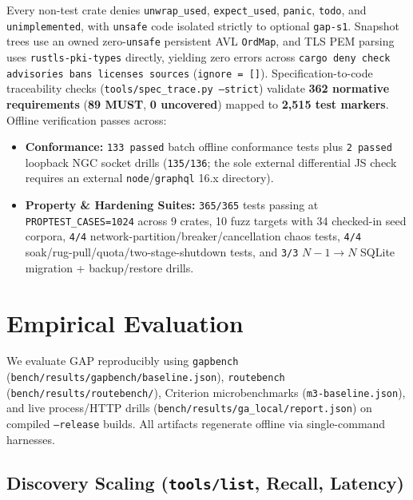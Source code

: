 \documentclass[10pt,twocolumn]{article}
\begin{document}
Every non-test crate denies \texttt{unwrap\_used}, \texttt{expect\_used}, \texttt{panic}, \texttt{todo}, and \texttt{unimplemented}, with \texttt{unsafe} code isolated strictly to optional \texttt{gap-s1}. Snapshot trees use an owned zero-\texttt{unsafe} persistent AVL \texttt{OrdMap}, and TLS PEM parsing uses \texttt{rustls-pki-types} directly, yielding zero errors across \texttt{cargo deny check advisories bans licenses sources} (\texttt{ignore = []}). Specification-to-code traceability checks (\texttt{tools/spec\_trace.py --strict}) validate \textbf{362 normative requirements} (\textbf{89 MUST}, \textbf{0 uncovered}) mapped to \textbf{2,515 test markers}. Offline verification passes across:
\begin{itemize}
  \item \textbf{Conformance:} \texttt{133 passed} batch offline conformance tests plus \texttt{2 passed} loopback NGC socket drills (\texttt{135/136}; the sole external differential JS check requires an external \texttt{node}/\texttt{graphql} 16.x directory).
  \item \textbf{Property \& Hardening Suites:} \texttt{365/365} tests passing at \texttt{PROPTEST\_CASES=1024} across 9 crates, 10 fuzz targets with 34 checked-in seed corpora, \texttt{4/4} network-partition/breaker/cancellation chaos tests, \texttt{4/4} soak/rug-pull/quota/two-stage-shutdown tests, and \texttt{3/3} $N-1 \rightarrow N$ SQLite migration + backup/restore drills.
\end{itemize}

\section{Empirical Evaluation}
\label{sec:eval}

We evaluate GAP reproducibly using \texttt{gapbench} (\texttt{bench/results/gapbench/baseline.json}), \texttt{routebench} (\texttt{bench/results/routebench/}), Criterion microbenchmarks (\texttt{m3-baseline.json}), and live process/HTTP drills (\texttt{bench/results/ga\_local/report.json}) on compiled \texttt{--release} builds. All artifacts regenerate offline via single-command harnesses.

\subsection{Discovery Scaling (\texttt{tools/list}, Recall, Latency)}
\end{document}
